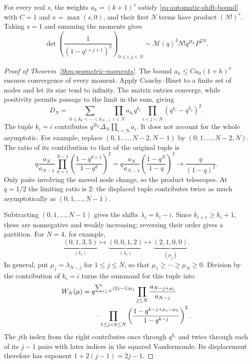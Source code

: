 \documentclass[11pt]{article}
\begin{document}
For every real $s$, the weights $a_k=(k+1)^s$ satisfy
\eqref{eq:automatic-shift-bound} with $C=1$ and
$\kappa=\max(s,0)$, and their first $N$ terms have product $(N!)^s$.
Taking $s=1$ and summing the moments gives
\begin{equation}\label{eq:squared-cauchy-example}
 \det\left(\frac1{(1-q^{i+j+1})^2}\right)_{0\le i,j<N}
 \sim\mathcal M(q)^3N!q^{B_N}P^{2N}.
\end{equation}
\begin{proof}[Proof of Theorem~\ref{thm:geometric-moments}]
The bound $a_h\le Ca_0(1+h)^\kappa$ ensures convergence of every
moment. Apply Cauchy--Binet to a finite set of nodes and let its
size tend to infinity. The matrix entries converge, while positivity
permits passage to the limit in the sum, giving
\begin{equation}\label{eq:heine-geometric}
 D_N=\sum_{0\le k_0<\cdots<k_{N-1}}
 \prod_{i<N}a_{k_i}q^{k_i}
 \prod_{i<j<N}(q^{k_i}-q^{k_j})^2.
\end{equation}
The tuple $k_i=i$ contributes $q^{B_N}\Delta_N\prod_{i<N}a_i$.
It does not account for the whole asymptotic. For example, replace
$(0,1,\ldots,N-2,N-1)$ by $(0,1,\ldots,N-2,N)$. The ratio of
its contribution to that of the original tuple is
\begin{equation}\label{eq:last-node-shift}
 q\frac{a_N}{a_{N-1}}
 \prod_{d=1}^{N-1}\left(\frac{1-q^{d+1}}{1-q^d}\right)^2
 =q\frac{a_N}{a_{N-1}}\left(\frac{1-q^N}{1-q}\right)^2
 \longrightarrow\frac{q}{(1-q)^2}.
\end{equation}
Only pairs involving the moved node change, so the product
telescopes. At $q=1/2$ the limiting ratio is $2$: the displaced tuple
contributes twice as much asymptotically as $(0,1,\ldots,N-1)$.

Subtracting $(0,1,\ldots,N-1)$ gives the shifts $\lambda_i=k_i-i$.
Since $k_{i+1}\ge k_i+1$, these are nonnegative and weakly increasing;
reversing their order gives a partition. For $N=4$, for example,
\[
 \underbrace{(0,1,3,5)}_{(k_i)}
 \longmapsto\underbrace{(0,0,1,2)}_{(\lambda_i)}
 \longmapsto\underbrace{(2,1,0,0)}_{(\mu_j)}.
\]
In general, put $\mu_j=\lambda_{N-j}$ for $1\le j\le N$, so that
$\mu_1\ge\cdots\ge\mu_N\ge0$. Division by the contribution of
$k_i=i$ turns the summand for this tuple into
\begin{equation}\label{eq:partition-summand}
\begin{split}
 W_N(\mu)={}&q^{\sum_{j\le N}(2j-1)\mu_j}
 \prod_{j\le N}\frac{a_{N-j+\mu_j}}{a_{N-j}}\\
 &\hspace{2mm}\cdot\prod_{1\le j<k\le N}
 \left(\frac{1-q^{k-j+\mu_j-\mu_k}}{1-q^{k-j}}\right)^2.
\end{split}
\end{equation}
The $j$th index from the right contributes once through $q^{k_i}$
and twice through each of its $j-1$ pairs with later indices in
the squared Vandermonde. Its displacement therefore has exponent
$1+2(j-1)=2j-1$.


\end{proof}
\end{document}
